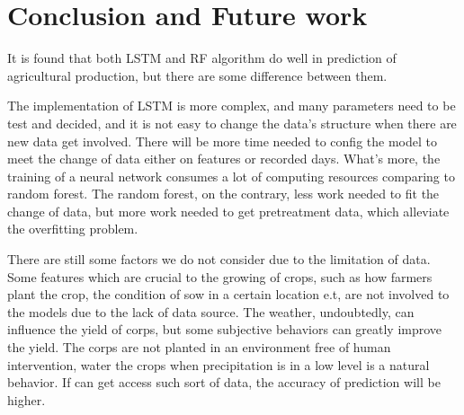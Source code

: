 \documentclass[conference]{IEEEtran}
\begin{document}
\section{Conclusion and Future work} \label{sec:con}
It is found that both LSTM and RF algorithm do well in prediction of agricultural production, but there are some difference between them.

The implementation of LSTM is more complex, and many parameters need to be test and decided, and it is not easy to change the data's structure when there are new data get involved. There will be more time needed to config the model to meet the change of data either on features or recorded days. What's more, the training of a neural network consumes a lot of computing resources comparing to random forest. The random forest, on the contrary, less work needed to fit the change of data, but more work needed to get pretreatment data, which alleviate the overfitting problem.

There are still some factors we do not consider due to the limitation of data. Some features which are crucial to the growing of crops, such as how farmers plant the crop, the condition of sow in a certain location e.t, are not involved to the models due to the lack of data source. The weather, undoubtedly, can influence the yield of corps, but some subjective behaviors can greatly improve the yield. The corps are not planted in an environment free of human intervention, water the crops when precipitation is in a low level is a natural behavior. If can get access such sort of data, the accuracy of prediction will be higher. 



\end{document}
